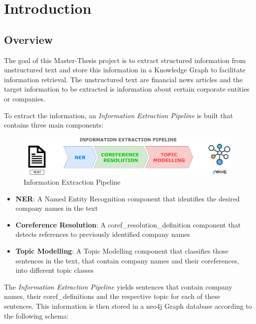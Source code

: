 \chapter{Introduction}\label{ch:introduction}
\section{Overview}
The goal of this Master-Thesis project is to extract structured information from unstructured text and store this information in a Knowledge Graph to facilitate information retrieval.
The unstructured text are financial news articles and the target information to be extracted is information about certain corporate entities or companies.

To extract the information, an \emph{Information Extraction Pipeline} is built that contains three main components:

\begin{figure}[H]
	\centering
	\includegraphics[width=1.0\textwidth]{Assets/pipelineAll}
	\caption{Information Extraction Pipeline}
	\label{fig:infoextract}
\end{figure}


\begin{itemize}
	\item \textbf{NER}: A Named Entity Recognition component that identifies the desired company names in the text
	\item \textbf{Coreference Resolution}: A \gls{coref_resolution_definition} component that detects references to previously identified company names
	\item \textbf{Topic Modelling}: A Topic Modelling component that classifies those sentences in the text, that contain company names and their coreferences, into different topic classes
\end{itemize}

The \emph{Information Extraction Pipeline} yields sentences that contain company names, their \glspl{coref_definition} and the respective topic for each of these sentences.
This information is then stored in a neo4j \cite{neo4j} Graph database according to the following schema:


